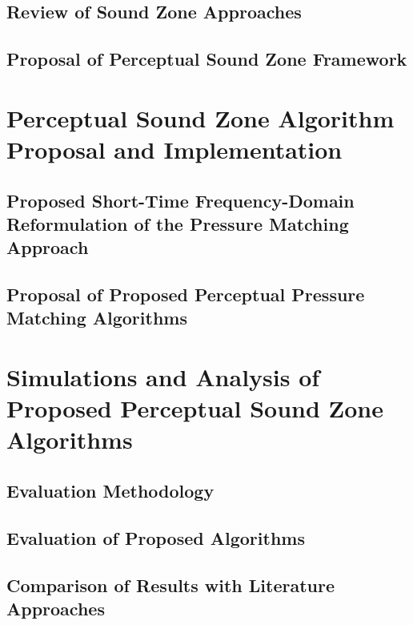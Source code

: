\documentclass[10pt,twoside,openright,titlepage]{ce}
\begin{document}
\section{Review of Sound Zone Approaches}
\label{ch:sound_zone:approaches}

\newpage
\section{Proposal of Perceptual Sound Zone Framework}
\label{ch:sound_zone:approach_selection}

\newpage

\chapter{Perceptual Sound Zone Algorithm Proposal and Implementation}
\label{ch:perceptual_sound_zone}

\newpage
\section{Proposed Short-Time Frequency-Domain Reformulation of the Pressure Matching Approach}
\label{ch:perceptual_sound_zone:stft}

\newpage
\section{Proposal of Proposed Perceptual Pressure Matching Algorithms}
\label{ch:perceptual_sound_zone:perceptual_minimization}

\newpage

\chapter{Simulations and Analysis of Proposed Perceptual Sound Zone Algorithms}
\label{ch:results}

\newpage
\section{Evaluation Methodology}
\label{ch:results:methodology}

\newpage
\section{Evaluation of Proposed Algorithms}
\label{ch:results:evaluation}

\newpage
\section{Comparison of Results with Literature Approaches}
\label{ch:results:comparision}

\newpage
\end{document}
